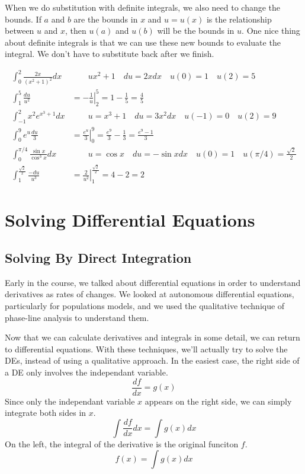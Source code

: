 \documentclass[fleqn]{report}
\begin{document}
When we do substitution with definite integrals, we also need
to change the bounds. If $a$ and $b$ are the bounds in $x$
and $u = u(x)$ is the relationship between $u$ and $x$, then
$u(a)$ and $u(b)$ will be the bounds in $u$. One nice thing
about definite integrals is that we can use these new bounds
to evaluate the integral. We don't have to
substitute back after we finish. 

\begin{example}
\begin{align*}
\int_0^2 \frac{2x}{(x^2+1)^2} dx & \quad \quad u x^2+1 \quad du
= 2xdx \quad u(0) = 1 \quad u(2) = 5 \\
\int_1^5 \frac{du}{u^2} & = \left. -\frac{1}{u} \right|_2^5 =
1 - \frac{1}{5} = \frac{4}{5} \\
\int_{-1}^2 x^2 e^{x^3+1} dx & \quad \quad u = x^3+1 \quad du =
3x^2dx \quad u(-1) = 0 \quad u(2) = 9 \\
\int_0^9 e^u \frac{du}{3} & = \left. \frac{e^u}{3} \right|_0^9 =
\frac{e^9}{3} - \frac{1}{3} = \frac{e^9-1}{3} \\
\int_0^{\pi/4} \frac{\sin x}{\cos^3 x} dx & \quad \quad u = \cos
x \quad du = -\sin x dx \quad u(0) = 1 \quad u(\pi/4) =
\frac{\sqrt{2}}{2} \\
\int_1^{\frac{\sqrt{2}}{2}} \frac{-du}{u^3} & = \left.
\frac{2}{u^2} \right|_1^{\frac{\sqrt{2}}{2}} = 4-2 = 2
\end{align*}
\end{example}

\section{Solving Differential Equations}
\label{des}

\subsection{Solving By Direct Integration}
\label{direct-integration}

Early in the course, we talked about differential equations in
order to understand derivatives as rates of changes. We looked
at autonomous differential equations, particularly for
populations models, and we used the qualitative technique of
phase-line analysis to understand them.

Now that we can calculate derivatives and integrals in some
detail, we can return to differential equations. With these
techniques, we'll actually try to solve the DEs, instead of
using a qualitative approach. In the easiest case, the right
side of a DE only involves the independant variable.
\begin{equation*}
\frac{df}{dx} = g(x)
\end{equation*}
Since only the independant variable $x$ appears on the right
side, we can simply integrate both sides in $x$.
\begin{equation*}
\int \frac{df}{dx} dx = \int g(x) dx
\end{equation*}
On the left, the integral of the derivative is the original
funciton $f$.
\begin{equation*}
f(x) = \int g(x) dx
\end{equation*}
\end{document}
